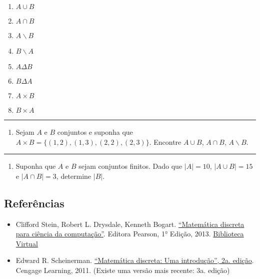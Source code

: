 \begin{enumerate}
\def\labelenumi{\alph{enumi}.}
\item
  \(A\cup B\)
\item
  \(A\cap B\)
\item
  \(A\backslash B\)
\item
  \(B\backslash A\)
\item
  \(A\Delta B\)
\item
  \(B\Delta A\)
\item
  \(A\times B\)
\item
  \(B\times A\)
\end{enumerate}

\begin{center}\rule{0.5\linewidth}{0.5pt}\end{center}

\begin{enumerate}
\def\labelenumi{\arabic{enumi}.}
\setcounter{enumi}{3}
\item
  Sejam \(A\) e \(B\) conjuntos e suponha que
  \(A\times B=\{(1,2),(1,3),(2,2),(2,3)\}\). Encontre \(A\cup B\),
  \(A\cap B\), \(A\backslash B\).
\end{enumerate}

\begin{center}\rule{0.5\linewidth}{0.5pt}\end{center}

\begin{enumerate}
\def\labelenumi{\arabic{enumi}.}
\setcounter{enumi}{4}
\item
  Suponha que \(A\) e \(B\) sejam conjuntos finitos. Dado que
  \(|A|=10\), \(|A\cup B|=15\) e \(|A\cap B|=3\), determine \(|B|\).
\end{enumerate}

    \hypertarget{referuxeancias}{%
\subsection{Referências}\label{referuxeancias}}

\begin{itemize}
\item
  Clifford Stein, Robert L. Drysdale, Kenneth Bogart.
  \href{https://plataforma.bvirtual.com.br/Acervo/Publicacao/3824}{``Matemática
  discreta para ciência da computação''}. Editora Pearson, 1° Edição,
  2013.
  \href{https://plataforma.bvirtual.com.br/Acervo/Publicacao/3824}{Biblioteca
  Virtual}
\item
  Edward R. Scheinerman.
  \href{https://www.amazon.com.br/Matem\%C3\%A1tica-Discreta-Introdu\%C3\%A7\%C3\%A3o-Edward-Scheinerman/dp/8522107963/}{``Matemática
  discreta: Uma introdução'', 2a. edição}. Cengage Learning, 2011.
  (Existe uma versão mais recente: 3a. edição)
\end{itemize}

